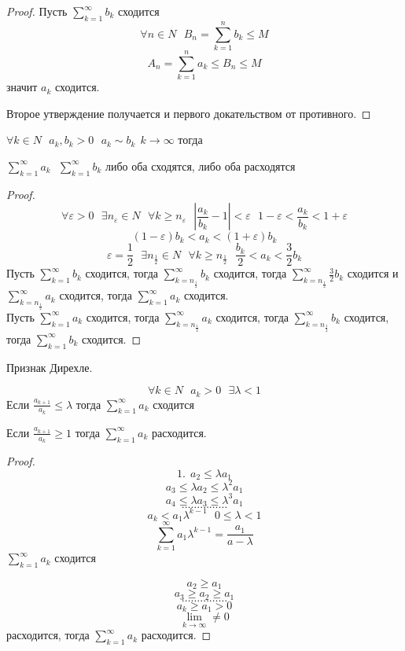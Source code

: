 \begin{proof}
  Пусть $\sum_{k=1}^{\infty} b_k$ сходится
  $$
  \forall n \in N ~~~ B_n = \sum_{k=1}^n b_k \le M
  $$
  $$
  A_n = \sum_{k=1}^n a_k \le B_n \le M
  $$
  значит $a_k$ сходится.

  Второе утверждение получается и первого докательством от противного.
\end{proof}

\begin{theorem}
  $\forall k \in N ~~~ a_k, b_k > 0 ~~~ a_k \sim b_k ~~ k \to \infty$ тогда

  $\sum_{k=1}^{\infty} a_k ~~~ \sum_{k=1}^{\infty} b_k$
  либо оба сходятся, либо оба расходятся
\end{theorem}

\begin{proof}
  $$
  \forall \varepsilon > 0 ~~~ \exists n_{\varepsilon} \in N ~~~
  \forall k \ge n_{\varepsilon} ~~~
  \left| \frac{a_k}{b_k} -1 \right| < \varepsilon ~~~
  1 - \varepsilon < \frac{a_k}{b_k} < 1 + \varepsilon
  $$
  $$
  (1 - \varepsilon)b_k < a_k < (1 + \varepsilon)b_k
  $$
  $$
  \varepsilon = \frac{1}{2} ~~~
  \exists n_{\frac{1}{2}} \in N ~~~
  \forall k \ge n_{\frac{1}{2}} ~~~
  \frac{b_k}{2} < a_k < \frac{3}{2} b_k
  $$
  Пусть $\sum_{k=1}^{\infty} b_k$ сходится, тогда
  $\sum_{k=n_{\frac{1}{2}}}^{\infty} b_k$ сходится, тогда
  $\sum_{k=n_{\frac{1}{2}}}^{\infty} \frac{3}{2} b_k$ сходится и
  $\sum_{k=n_{\frac{1}{2}}}^{\infty} a_k$ сходится, тогда
  $\sum_{k=1}^{\infty} a_k$ сходится.\\

  Пусть $\sum_{k=1}^{\infty} a_k$ сходится, тогда
  $\sum_{k=n_{\frac{1}{2}}}^{\infty} a_k$ сходится, тогда
  $\sum_{k=n_{\frac{1}{2}}}^{\infty} b_k$ сходится, тогда
  $\sum_{k=1}^{\infty} b_k$ сходится.
\end{proof}

\begin{title}
  Признак Дирехле.
\end{title}
\begin{block}
  $$
  \forall k \in N ~~~ a_k > 0 ~~~ \exists \lambda < 1
  $$
  Если $\frac{a_{k+1}}{a_k} \le \lambda$ тогда $\sum_{k=1}^{\infty} a_k$
  сходится

  Если $\frac{a_{k+1}}{a_k} \ge 1$ тогда $\sum_{k=1}^{\infty} a_k$ расходится.
\end{block}

\begin{proof}
  $$
  1. ~~ a_2 \le \lambda a_1
  $$
  $$
  a_3 \le \lambda a_2 \le \lambda^2 a_1
  $$
  $$
  a_4 \le \lambda a_3 \le \lambda^3 a_1
  $$
  $$
  \ldots \ldots \ldots \ldots \ldots
  $$
  $$
  a_k < a_1 \lambda^{k-1} ~~~ 0 \le \lambda < 1
  $$
  $$
  \sum_{k=1}^{\infty} a_1 \lambda^{k-1} = \frac{a_1}{a-\lambda}
  $$
  $\sum_{k=1}^{\infty} a_k$ сходится

  $$
  a_2 \ge a_1
  $$
  $$
  a_3 \ge a_2 \ge a_1
  $$
  $$
  \ldots \ldots \ldots \ldots \ldots
  $$
  $$
  a_k \ge a_1 > 0
  $$
  $$
  \lim_{k \to \infty} \not= 0
  $$
  расходится, тогда $\sum_{k=1}^{\infty} a_k$ расходится.
\end{proof}

